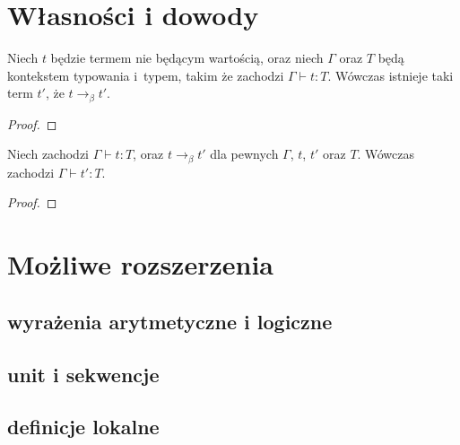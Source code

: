 \documentclass[11pt,leqno]{article}
\begin{document}
\section{Własności i dowody}
\setcounter{equation}{0}

\begin{twierdzenie}[Progres]
Niech $t$ będzie termem nie będącym wartością, oraz niech $\Gamma$ oraz $T$ będą
kontekstem typowania i~typem, takim że zachodzi $\Gamma\vdash t : T$. Wówczas istnieje
taki term $t'$, że $t \longrightarrow_\beta t'$.
\end{twierdzenie}
\begin{proof}
\end{proof}

\begin{twierdzenie}
Niech zachodzi $\Gamma \vdash t:T$, oraz $t \longrightarrow_\beta t'$ dla pewnych
$\Gamma$, $t$, $t'$ oraz $T$. Wówczas zachodzi
$\Gamma\vdash t' : T$.
\end{twierdzenie}
\begin{proof}
\end{proof}
	
\section{Możliwe rozszerzenia}                                 
\setcounter{equation}{0}


\subsection{wyrażenia arytmetyczne i logiczne}

\subsection{unit i sekwencje}
\subsection{definicje lokalne}
\end{document}
